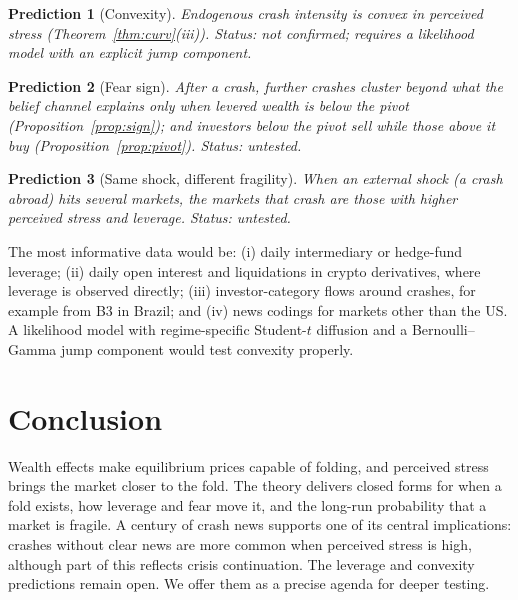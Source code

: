 \documentclass[11pt,a4paper]{article}
\newtheorem{prediction}{Prediction}
\theoremstyle{remark}
\begin{document}
\begin{prediction}[Convexity]
Endogenous crash intensity is convex in perceived stress (Theorem~\ref{thm:curv}(iii)).
\emph{Status:} not confirmed; requires a likelihood model with an explicit jump component.
\end{prediction}

\begin{prediction}[Fear sign]
After a crash, further crashes cluster beyond what the belief channel explains only when
levered wealth is below the pivot (Proposition~\ref{prop:sign}); and investors below the
pivot sell while those above it buy (Proposition~\ref{prop:pivot}). \emph{Status:} untested.
\end{prediction}

\begin{prediction}[Same shock, different fragility]
When an external shock (a crash abroad) hits several markets, the markets that crash are those
with higher perceived stress and leverage. \emph{Status:} untested.
\end{prediction}

\noindent The most informative data would be: (i) daily intermediary or hedge-fund leverage;
(ii) daily open interest and liquidations in crypto derivatives, where leverage is observed
directly; (iii) investor-category flows around crashes, for example from B3 in Brazil; and
(iv) news codings for markets other than the US. A likelihood model with regime-specific
Student-$t$ diffusion and a Bernoulli--Gamma jump component would test convexity properly.

\section{Conclusion}

Wealth effects make equilibrium prices capable of folding, and perceived stress brings the
market closer to the fold. The theory delivers closed forms for when a fold exists, how
leverage and fear move it, and the long-run probability that a market is fragile. A century
of crash news supports one of its central implications: crashes without clear news are more
common when perceived stress is high, although part of this reflects crisis continuation.
The leverage and convexity predictions remain open. We offer them as a precise agenda for
deeper testing.

\appendix
\end{document}
